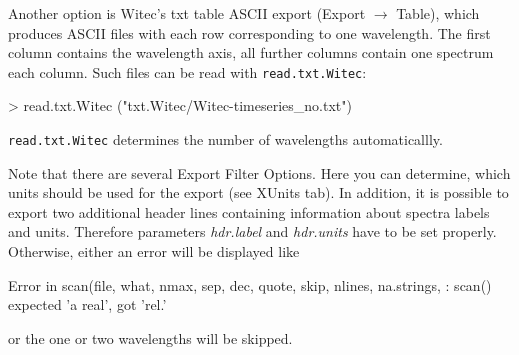 \documentclass[english, a4paper, 10pt, headings=small, DIV11]{scrartcl}
\renewenvironment{Schunk}{\vspace{0pt}\begin{small}}{\end{small}\vspace{0pt}}
\newcommand{\Rfunction}[2][]{\texorpdfstring{\nohyphens{#1\texttt{#2}}}{#2}}
\newcommand{\Rfunarg}[1]{\texorpdfstring{\nohyphens{\textit{#1}}}{#1}}
\begin{document}
Another option is Witec's txt table ASCII export (Export $\rightarrow$ Table), which produces ASCII files with each row corresponding to one wavelength. The first column contains the wavelength axis, all further columns contain one spectrum each column. Such files can be read with \Rfunction{read.txt.Witec}:
\begin{Schunk}
\begin{Sinput}
> read.txt.Witec ("txt.Witec/Witec-timeseries_no.txt")
\end{Sinput}
\end{Schunk}
\Rfunction{read.txt.Witec} determines the number of wavelengths automaticallly.

Note that there are several Export Filter Options. Here you can determine, which units should be used for the export (see XUnits tab). In addition, it is possible to export two additional header lines containing information about spectra labels and units. Therefore parameters \Rfunarg{hdr.label} and \Rfunarg{hdr.units} have to be set properly. Otherwise, either an error will be displayed like
\begin{Schunk}
\begin{Soutput}
Error in scan(file, what, nmax, sep, dec, quote, skip, nlines, na.strings,  :
  scan() expected 'a real', got 'rel.'
\end{Soutput}
\end{Schunk}
or the one or two wavelengths will be skipped.
\end{document}
